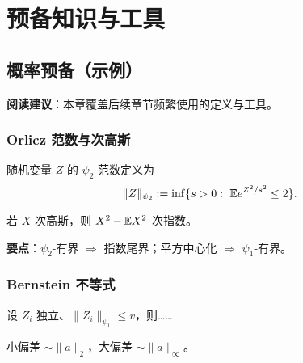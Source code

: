 \documentclass[10pt,openany]{book} %
\begin{document}

\setcounter{tocdepth}{2}
\TOCwithoutHeadFoot

\mainmatter

\part{预备知识与工具}
\chapter{概率预备（示例）}

\begin{SideBar}
\textbf{阅读建议}：本章覆盖后续章节频繁使用的定义与工具。
\end{SideBar}

\section{Orlicz 范数与次高斯}
\begin{definition}[Orlicz 范数]
随机变量 $Z$ 的 $\psi_2$ 范数定义为
\[
\|Z\|_{\psi_2} := \inf\{s>0:\ \E e^{Z^2/s^2}\le 2\}.
\]
\end{definition}

\begin{lemma}[基本性质（示例）]
若 $X$ 次高斯，则 $X^2-\mathbb{E} X^2$ 次指数。
\end{lemma}

\begin{KeyBox}
\textbf{要点}：\(\psi_2\)-有界 $\Rightarrow$ 指数尾界；平方中心化 $\Rightarrow$ \(\psi_1\)-有界。
\end{KeyBox}

\section{Bernstein 不等式}
\begin{theorem}[Bernstein（示例）]
设 $Z_i$ 独立、$\|Z_i\|_{\psi_1}\le v$，则……
\end{theorem}

\begin{Takeaway}
小偏差 $\sim \|a\|_2$，大偏差 $\sim \|a\|_\infty$。
\end{Takeaway}
\end{document}

